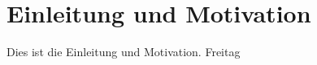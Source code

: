 \chapter{Einleitung und Motivation}\label{ch:ch1}
Dies ist die Einleitung und Motivation. Freitag



